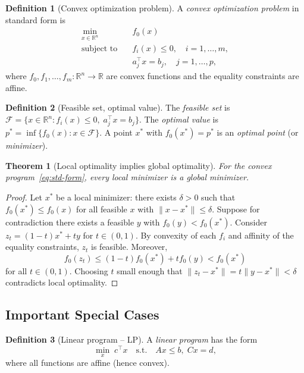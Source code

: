 \documentclass[11pt,a4paper]{article}
\theoremstyle{definition}
\newtheorem{definition}{Definition}[section]
\theoremstyle{plain}
\newtheorem{theorem}{Theorem}[section]
\theoremstyle{remark}
\newcommand{\R}{\mathbb{R}}
\begin{document}
\begin{definition}[Convex optimization problem]\label{def:convex-opt}
A \emph{convex optimization problem} in standard form is
\begin{equation}\label{eq:std-form}
\begin{aligned}
  \min_{x \in \R^n} \quad & f_0(x) \\
  \text{subject to} \quad & f_i(x) \le 0, \quad i = 1,\dots,m, \\
                          & a_j^\top x = b_j, \quad j = 1,\dots,p,
\end{aligned}
\end{equation}
where $f_0, f_1, \dots, f_m : \R^n \to \R$ are convex functions and the
equality constraints are affine.
\end{definition}

\begin{definition}[Feasible set, optimal value]\label{def:feasible}
The \emph{feasible set} is
$\mathcal{F} = \{x \in \R^n : f_i(x) \le 0,\; a_j^\top x = b_j\}$.
The \emph{optimal value} is $p^* = \inf\{f_0(x) : x \in \mathcal{F}\}$.
A point $x^*$ with $f_0(x^*) = p^*$ is an \emph{optimal point} (or
\emph{minimizer}).
\end{definition}

\begin{theorem}[Local optimality implies global optimality]\label{thm:local-global}
For the convex program~\eqref{eq:std-form}, every local minimizer is a global
minimizer.
\end{theorem}

\begin{proof}
Let $x^*$ be a local minimizer: there exists $\delta > 0$ such that
$f_0(x^*) \le f_0(x)$ for all feasible $x$ with $\|x - x^*\| \le \delta$.
Suppose for contradiction there exists a feasible $y$ with $f_0(y) < f_0(x^*)$.
Consider $z_t = (1-t)x^* + ty$ for $t \in (0,1)$. By convexity of each $f_i$
and affinity of the equality constraints, $z_t$ is feasible. Moreover,
\[
  f_0(z_t) \le (1-t) f_0(x^*) + t f_0(y) < f_0(x^*)
\]
for all $t \in (0,1)$. Choosing $t$ small enough that
$\|z_t - x^*\| = t\|y - x^*\| < \delta$ contradicts local optimality.
\end{proof}

\subsection{Important Special Cases}

\begin{definition}[Linear program -- LP]\label{def:lp}
A \emph{linear program} has the form
\[
  \min_{x} \; c^\top x \quad \text{s.t.} \quad Ax \le b, \; Cx = d,
\]
where all functions are affine (hence convex).
\end{definition}
\end{document}
